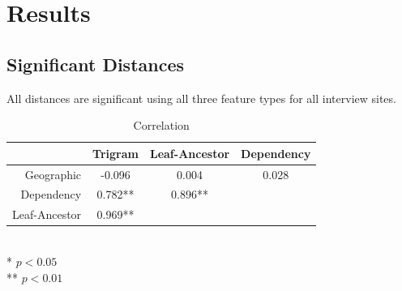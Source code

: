 \chapter{Results}

\section{Significant Distances}
All distances are significant using all three feature types for all
interview sites.

\begin{table}
\begin{tabular}{r|ccc}
  & Trigram & Leaf-Ancestor & Dependency  \\ \hline
  Geographic & -0.096 & 0.004 & 0.028 \\
  Dependency & 0.782** & 0.896** & \\
  Leaf-Ancestor & 0.969** & & \\
\end{tabular} \\
* $ p < 0.05$ \\
** $ p < 0.01$ \\
\label{correlation}
\caption{Correlation}
\end{table}

